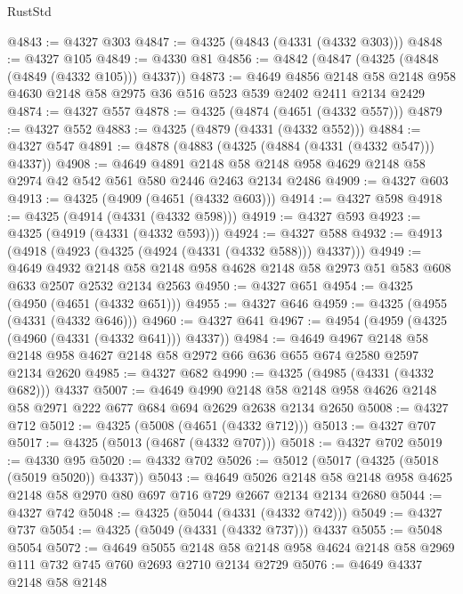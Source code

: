 \begin{lexlean}{RustStd}
\begin{coremodule}
@4843 := @4327 @303
@4847 := @4325 (@4843 (@4331 (@4332 @303)))
@4848 := @4327 @105
@4849 := @4330 @81
@4856 := @4842 (@4847 (@4325 (@4848 (@4849 (@4332 @105))) @4337))
@4873 := @4649
    @4856
    @2148
    @58
    @2148
    @958
    @4630
    @2148
    @58
    @2975
    @36
    @516
    @523
    @539
    @2402
    @2411
    @2134
    @2429
@4874 := @4327 @557
@4878 := @4325 (@4874 (@4651 (@4332 @557)))
@4879 := @4327 @552
@4883 := @4325 (@4879 (@4331 (@4332 @552)))
@4884 := @4327 @547
@4891 := @4878 (@4883 (@4325 (@4884 (@4331 (@4332 @547))) @4337))
@4908 := @4649
    @4891
    @2148
    @58
    @2148
    @958
    @4629
    @2148
    @58
    @2974
    @42
    @542
    @561
    @580
    @2446
    @2463
    @2134
    @2486
@4909 := @4327 @603
@4913 := @4325 (@4909 (@4651 (@4332 @603)))
@4914 := @4327 @598
@4918 := @4325 (@4914 (@4331 (@4332 @598)))
@4919 := @4327 @593
@4923 := @4325 (@4919 (@4331 (@4332 @593)))
@4924 := @4327 @588
@4932 := @4913 (@4918 (@4923 (@4325 (@4924 (@4331 (@4332 @588))) @4337)))
@4949 := @4649
    @4932
    @2148
    @58
    @2148
    @958
    @4628
    @2148
    @58
    @2973
    @51
    @583
    @608
    @633
    @2507
    @2532
    @2134
    @2563
@4950 := @4327 @651
@4954 := @4325 (@4950 (@4651 (@4332 @651)))
@4955 := @4327 @646
@4959 := @4325 (@4955 (@4331 (@4332 @646)))
@4960 := @4327 @641
@4967 := @4954 (@4959 (@4325 (@4960 (@4331 (@4332 @641))) @4337))
@4984 := @4649
    @4967
    @2148
    @58
    @2148
    @958
    @4627
    @2148
    @58
    @2972
    @66
    @636
    @655
    @674
    @2580
    @2597
    @2134
    @2620
@4985 := @4327 @682
@4990 := @4325 (@4985 (@4331 (@4332 @682))) @4337
@5007 := @4649
    @4990
    @2148
    @58
    @2148
    @958
    @4626
    @2148
    @58
    @2971
    @222
    @677
    @684
    @694
    @2629
    @2638
    @2134
    @2650
@5008 := @4327 @712
@5012 := @4325 (@5008 (@4651 (@4332 @712)))
@5013 := @4327 @707
@5017 := @4325 (@5013 (@4687 (@4332 @707)))
@5018 := @4327 @702
@5019 := @4330 @95
@5020 := @4332 @702
@5026 := @5012 (@5017 (@4325 (@5018 (@5019 @5020)) @4337))
@5043 := @4649
    @5026
    @2148
    @58
    @2148
    @958
    @4625
    @2148
    @58
    @2970
    @80
    @697
    @716
    @729
    @2667
    @2134
    @2134
    @2680
@5044 := @4327 @742
@5048 := @4325 (@5044 (@4331 (@4332 @742)))
@5049 := @4327 @737
@5054 := @4325 (@5049 (@4331 (@4332 @737))) @4337
@5055 := @5048 @5054
@5072 := @4649
    @5055
    @2148
    @58
    @2148
    @958
    @4624
    @2148
    @58
    @2969
    @111
    @732
    @745
    @760
    @2693
    @2710
    @2134
    @2729
@5076 := @4649 @4337 @2148 @58 @2148

\end{coremodule}
\end{lexlean}
